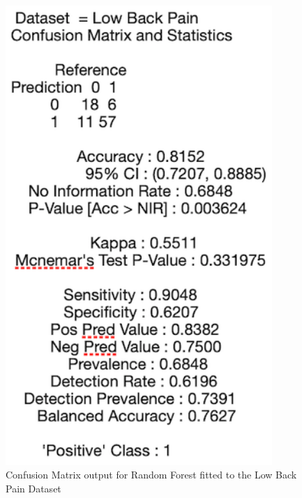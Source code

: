 \begin{figure}[!htbp]
\begin{minipage}{0.45\textwidth}
        \includegraphics[width=0.9\textwidth]{ThesisTemplate/appendix/images/Chapter5Appendix/ConfusionMatrix/LowBackPain.png} 
        \caption{Confusion Matrix output for Random Forest fitted to the Low Back Pain Dataset}
        \label{fig:matrixLBP}
    \end{minipage}
\end{figure}

